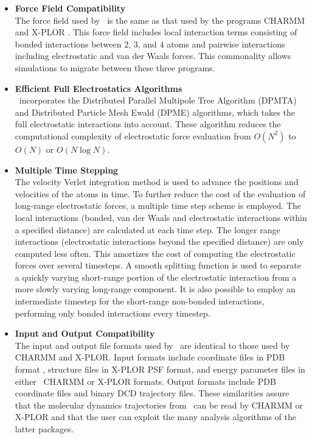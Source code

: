 \begin{itemize}

\item{\bf Force Field Compatibility}\\
The force field used by \NAMD\ is the same as that used by the programs 
CHARMM  and X-PLOR 
.  This force field includes local 
interaction terms consisting of bonded interactions between 2, 3, and 4 atoms 
and pairwise interactions including electrostatic and van der Waals forces.
This commonality allows simulations to migrate between these three programs.

\item{\bf Efficient Full Electrostatics Algorithms}\\
\NAMD\ incorporates the Distributed Parallel Multipole Tree Algorithm 
(DPMTA)  and Distributed Particle Mesh
Ewald (DPME) algorithms, which takes the full electrostatic
interactions into account.  These algorithm reduces the computational
complexity of electrostatic force evaluation from $O(N^2)$ to $O(N)$
or $O(N \log N)$.

\item{\bf Multiple Time Stepping}\\
The velocity Verlet integration method
is used to advance the positions and velocities of the atoms in time.
To further reduce the cost of the evaluation of 
long-range electrostatic forces, 
a multiple time step scheme is employed.  The local
interactions (bonded, van der Waals and electrostatic interactions within a
specified distance) are calculated at each time step.  The longer range
interactions (electrostatic interactions beyond the specified distance) are
only computed less often.
This amortizes the cost of computing the electrostatic forces over several timesteps.
A smooth splitting function is used to separate a quickly varying short-range portion of the electrostatic interaction from a more slowly varying long-range component.
It is also possible to employ an intermediate timestep for the short-range non-bonded interactions, performing only bonded interactions every timestep.


\item{\bf Input and Output Compatibility}\\
The input and output file formats used by \NAMD\ are identical to those
used by CHARMM and X-PLOR.  Input formats include coordinate files in PDB format
, structure files in X-PLOR PSF format, 
and energy parameter files in either ~CHARMM or X-PLOR formats.
Output formats include PDB coordinate files and binary DCD trajectory files.
These similarities assure that the molecular dynamics trajectories from \NAMD\ 
can be read by CHARMM or X-PLOR and that the user can exploit the many 
analysis algorithms of the latter packages.


\end{itemize}
